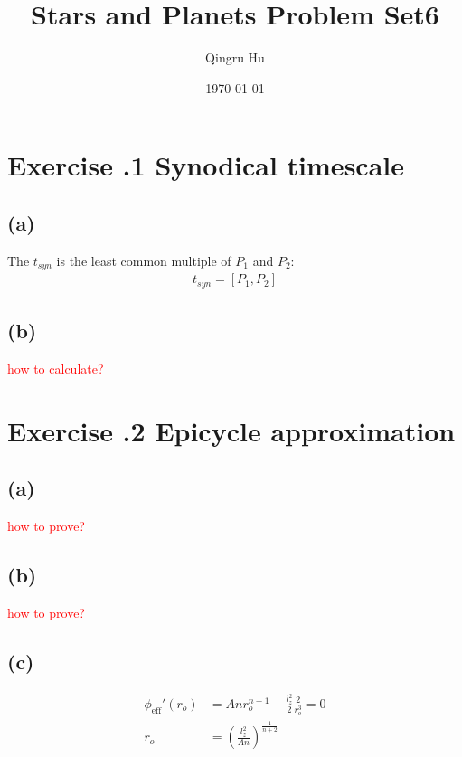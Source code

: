 \documentclass[a4paper,12pt]{article}
\title{\textbf{Stars and Planets Problem Set6}}
\author{Qingru Hu}
\date{\today}
\begin{document}
\maketitle
\section*{\textbf{Exercise \uppercase\expandafter{}.1 Synodical timescale}}
\subsection*{(a)}
The $t_{syn}$ is the least common multiple of $P_1$ and $P_2$:
\begin{align*}
    t_{syn} = [P_1, P_2]
\end{align*}

\subsection*{(b)}
\textcolor{red}{how to calculate?}


\section*{\textbf{Exercise \uppercase\expandafter{}.2 Epicycle approximation}}
\subsection*{(a)}
\textcolor{red}{how to prove?}

\subsection*{(b)}
\textcolor{red}{how to prove?}

\subsection*{(c)}
\begin{align*}
    \phi_{\text{eff}}'(r_o) &= An r_o^{n-1} - \frac{l_z^2}{2} \frac{2}{r_o^3} = 0 \\
    r_o &= (\frac{l_z^2}{An})^{\frac{1}{n+2}}
\end{align*}
\end{document}
